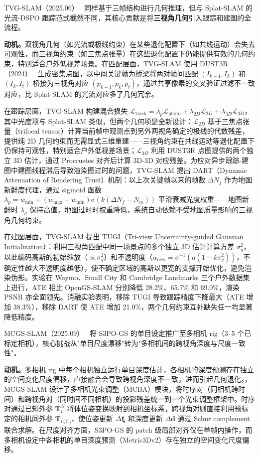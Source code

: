 TVG-SLAM（2025.06）~\cite{2506_23207} 同样基于三帧结构进行几何推理，但与 Splat-SLAM 的光流-DSPO 跟踪范式截然不同，其核心贡献是将\textbf{三视角几何}引入跟踪和建图的全流程。

\textbf{动机。}双视角几何（如光流或极线约束）在某些退化配置下（如共线运动）会失去可观性，而三视角约束（如三焦点张量）在这些退化配置下仍能提供有效的几何约束，特别适合户外低视差场景。在匹配层面，TVG-SLAM 使用 DUST3R（2024）~\cite{wang2024dust3r} 生成密集点图，以中间关键帧为桥梁将两对帧间匹配 $(I_{k-1}, I_k)$ 和 $(I_k, I_t)$ 桥接为三视角对应 $(p_{k-1}, p_k, p_t)$，通过共享像素的交叉验证过滤不一致对应，比 Splat-SLAM 的光流对应多了几何冗余。

在跟踪层面，TVG-SLAM 构建混合损失 $\mathcal{L}_{\mathrm{track}} = \lambda_p \mathcal{L}_{\mathrm{photo}} + \lambda_{2D} \mathcal{L}_{2D} + \lambda_{3D} \mathcal{L}_{3D}$，其中光度项与 Splat-SLAM 类似，但两个几何项是全新设计：$\mathcal{L}_{2D}$ 基于三焦点张量（trifocal tensor）计算当前帧中观测点到另外两视角确定的极线的代数残差，提供纯 2D 几何约束而无需显式三维重建——三视角约束在共线运动等退化配置下仍保持可观性，特别适合户外低视差场景；$\mathcal{L}_{3D}$ 利用 DUST3R 点图提供的两个独立 3D 估计，通过 Procrustes 对齐后计算 3D-3D 对应残差。为应对异步跟踪-建图中建图线程滞后导致渲染图过时的问题，TVG-SLAM 提出 DART（Dynamic Attenuation of Rendering Trust）机制：以上次关键帧以来的帧数 $\Delta N_f$ 作为地图新鲜度代理，通过 sigmoid 函数 $\lambda_p = w_{\min} + (w_{\max} - w_{\min})\sigma(k(\Delta N_f - N_m))$ 平滑衰减光度权重——地图新鲜时 $\lambda_p$ 保持高值，地图过时时权重降低，系统自动依赖不受地图质量影响的三视角几何约束。

在建图层面，TVG-SLAM 提出 TUGI（Tri-view Uncertainty-guided Gaussian Initialization）：利用三视角匹配中同一场景点的多个独立 3D 估计计算方差 $\sigma_g^2$，以此编码高斯的初始缩放（$\propto \sigma_g^2$）和不透明度（$\alpha_{\mathrm{new}} = \sigma^{-1}(a(1 - k\sigma_g^2))$，不确定性越大不透明度越低），使不确定区域的高斯以更宽的支撑开始优化，避免渲染伪影。实验在 Waymo、Small City 和 Cambridge Landmarks 三个户外数据集上进行，ATE 相比 OpenGS-SLAM 分别降低 28.2\%、65.7\% 和 69.0\%，渲染 PSNR 亦全面领先。消融实验表明，移除 TUGI 导致跟踪精度下降最大（ATE 增加 38.3\%），移除 DART 使 ATE 增加 21.0\%，两个几何约束互补缺失任一均显著降低精度。

MCGS-SLAM（2025.09）~\cite{2509_14191} 将 S3PO-GS 的单目设定推广至多相机 rig（3--5 个已标定相机），核心挑战从"单目尺度漂移"转为"多相机间的跨视角深度与尺度一致性"。

\textbf{动机。}多相机 rig 中每个相机独立运行单目深度估计，各相机的深度预测存在独立的空间变化尺度偏移，直接融合会导致跨视角深度不一致，进而引起几何退化。，MCGS-SLAM 设计了多相机光束调整（MCBA）模块，将时序对（同相机跨时间）和跨视角对（同时间不同相机）的投影残差统一到一个光束调整框架中。时序对通过已知外参 $\mathbf{T}_C^B$ 将体位姿变换映射到相机坐标系，跨视角对则直接利用预标定的相机间外参 $\mathbf{T}_{C_i C_j}$，使位姿更新 $\Delta\boldsymbol{\xi}$ 和深度更新 $\Delta\mathbf{d}$ 通过 Schur complement 联合求解。在尺度对齐方面，S3PO-GS 的 patch 级局部对齐仅在单帧内操作，而多相机设定中各相机的单目深度预测（Metric3Dv2）存在独立的空间变化尺度偏移。

